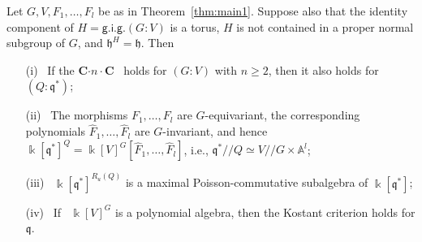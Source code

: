 \begin{thm}   \label{thm:main2}
Let $G, V, F_1,\dots, F_l$ be as in Theorem~\ref{thm:main1}. Suppose also that the identity
component of $H={\mathsf{g.i.g.}}(G:V)$ is a torus,  $H$ is not contained in a proper normal 
subgroup of $G$, and ${{\mathfrak h}}^H={{\mathfrak h}}$. Then 
\begin{itemize}
\item[\sf (i)] \ If the {\textsf{\bfseries C${\cdot}n{\cdot}$C}\ } holds for $(G:V)$ with $n{\geqslant} 2$, then it also holds for $(Q:{{\mathfrak q}}^*)$;
\item[\sf (ii)] \  The morphisms $F_1,\dots, F_l$ are $G$-equivariant, 
the corresponding polynomials $\hat F_1,\dots, \hat F_l$ are $G$-invariant,
and hence ${\Bbbk}[{{\mathfrak q}}^*]^Q={\Bbbk}[V]^G[\hat F_1,\dots,\hat F_l]$, i.e.,
${{\mathfrak q}}^*{/\!\!/} Q \simeq V{/\!\!/} G \times \mathbb A^l$;
\item[\sf (iii)] \  ${\Bbbk}[{{\mathfrak q}}^*]^{R_u(Q)}$ is a maximal Poisson-commutative subalgebra of ${\Bbbk}[{{\mathfrak q}}^*]$;
\item[\sf (iv)] \  If \ ${\Bbbk}[V]^G$ is a polynomial algebra, then the Kostant criterion holds for ${{\mathfrak q}}$.
\end{itemize}
\end{thm}
